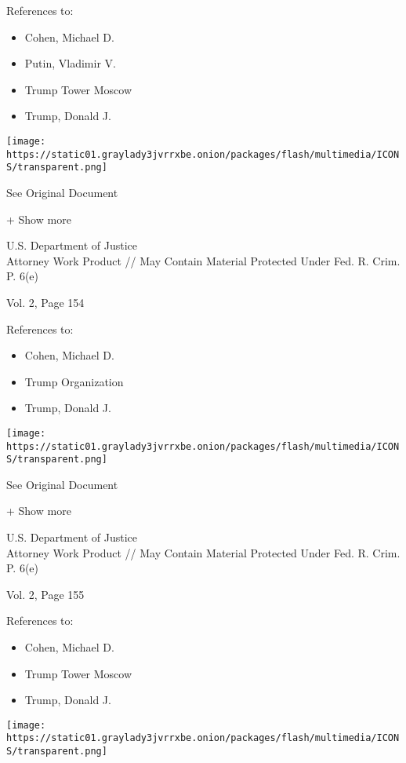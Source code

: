 References to:

\begin{itemize}
\tightlist
\item
  Cohen, Michael D.
\item
  Putin, Vladimir V.
\item
  Trump Tower Moscow
\item
  Trump, Donald J.
\end{itemize}

\protect\hyperlink{}{}

\texttt{[image: https://static01.graylady3jvrrxbe.onion/packages/flash/multimedia/ICONS/transparent.png]}

See Original Document

+ Show more

U.S. Department of Justice\\
Attorney Work Product // May Contain Material Protected Under Fed. R.
Crim. P. 6(e)

Vol. 2, Page 154

References to:

\begin{itemize}
\tightlist
\item
  Cohen, Michael D.
\item
  Trump Organization
\item
  Trump, Donald J.
\end{itemize}

\protect\hyperlink{}{}

\texttt{[image: https://static01.graylady3jvrrxbe.onion/packages/flash/multimedia/ICONS/transparent.png]}

See Original Document

+ Show more

U.S. Department of Justice\\
Attorney Work Product // May Contain Material Protected Under Fed. R.
Crim. P. 6(e)

Vol. 2, Page 155

References to:

\begin{itemize}
\tightlist
\item
  Cohen, Michael D.
\item
  Trump Tower Moscow
\item
  Trump, Donald J.
\end{itemize}

\protect\hyperlink{}{}

\texttt{[image: https://static01.graylady3jvrrxbe.onion/packages/flash/multimedia/ICONS/transparent.png]}

